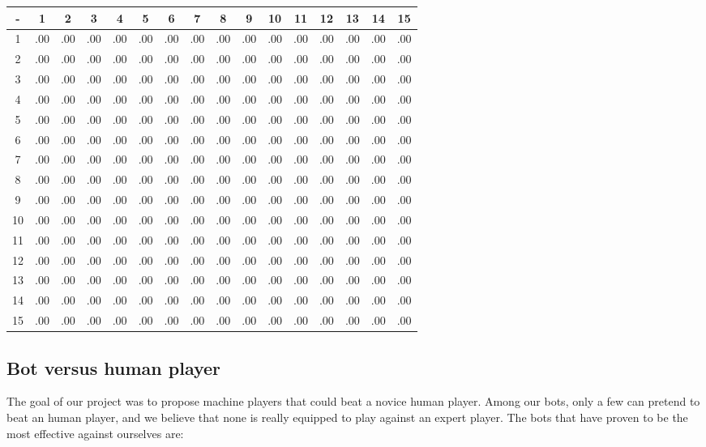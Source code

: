 {\tiny
\begin{tabular}{ | c | c c c c c c c c c c c c c c c | }

\hline
 -  & 1 & 2 & 3 & 4 & 5 & 6 & 7 & 8 & 9 & 10 & 11 & 12 & 13 & 14 & 15 \\ \hline
1  & .00 & .00 & .00 & .00 & .00 & .00 & .00 & .00 & .00 & .00  & .00  & .00  & .00  & .00  & .00  \\
2  & .00 & .00 & .00 & .00 & .00 & .00 & .00 & .00 & .00 & .00  & .00  & .00  & .00  & .00  & .00  \\
3  & .00 & .00 & .00 & .00 & .00 & .00 & .00 & .00 & .00 & .00  & .00  & .00  & .00  & .00  & .00  \\
4  & .00 & .00 & .00 & .00 & .00 & .00 & .00 & .00 & .00 & .00  & .00  & .00  & .00  & .00  & .00  \\
5  & .00 & .00 & .00 & .00 & .00 & .00 & .00 & .00 & .00 & .00  & .00  & .00  & .00  & .00  & .00  \\
6  & .00 & .00 & .00 & .00 & .00 & .00 & .00 & .00 & .00 & .00  & .00  & .00  & .00  & .00  & .00  \\
7  & .00 & .00 & .00 & .00 & .00 & .00 & .00 & .00 & .00 & .00  & .00  & .00  & .00  & .00  & .00  \\
8  & .00 & .00 & .00 & .00 & .00 & .00 & .00 & .00 & .00 & .00  & .00  & .00  & .00  & .00  & .00  \\
9  & .00 & .00 & .00 & .00 & .00 & .00 & .00 & .00 & .00 & .00  & .00  & .00  & .00  & .00  & .00  \\
10 & .00 & .00 & .00 & .00 & .00 & .00 & .00 & .00 & .00 & .00  & .00  & .00  & .00  & .00  & .00  \\
11 & .00 & .00 & .00 & .00 & .00 & .00 & .00 & .00 & .00 & .00  & .00  & .00  & .00  & .00  & .00  \\
12 & .00 & .00 & .00 & .00 & .00 & .00 & .00 & .00 & .00 & .00  & .00  & .00  & .00  & .00  & .00  \\
13 & .00 & .00 & .00 & .00 & .00 & .00 & .00 & .00 & .00 & .00  & .00  & .00  & .00  & .00  & .00  \\
14 & .00 & .00 & .00 & .00 & .00 & .00 & .00 & .00 & .00 & .00  & .00  & .00  & .00  & .00  & .00  \\
15 & .00 & .00 & .00 & .00 & .00 & .00 & .00 & .00 & .00 & .00  & .00  & .00  & .00  & .00  & .00  \\ \hline

\end{tabular}}

\subsection{Bot versus human player}
The goal of our project was to propose machine players that could beat
a novice human player. Among our bots, only a few can pretend to beat
an human player, and we believe that none is really equipped to play
against an expert player. The bots that have proven to be the most
effective against ourselves are:

